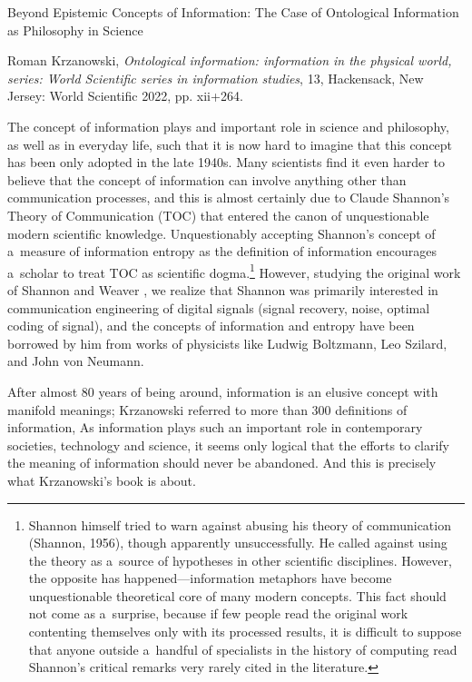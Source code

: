 

Beyond Epistemic Concepts of Information: The Case of Ontological Information as Philosophy in Science


Roman Krzanowski, \textit{Ontological information: information in the physical world, series: World Scientific series in information studies}, 13, Hackensack, New Jersey: World Scientific 2022, pp. xii+264.

The concept of information plays and important role in science and philosophy, as well as in everyday life, such that it is now hard to imagine that this concept has been only adopted in the late 1940s. Many scientists find it even harder to believe that the concept of information can involve anything other than communication processes, and this is almost certainly due to Claude Shannon's Theory of Communication (TOC)
\parencite[][]{shannon_mathematical_1949} %
 that entered the canon of unquestionable modern scientific knowledge. Unquestionably accepting Shannon's concept of a~measure of information entropy as the definition of information encourages a~scholar to treat TOC as scientific dogma.\footnote{ Shannon himself tried to warn against abusing his theory of communication (Shannon, 1956), though apparently unsuccessfully. He called against using the theory as a~source of hypotheses in other scientific disciplines. However, the opposite has happened—information metaphors have become unquestionable theoretical core of many modern concepts. This fact should not come as a~surprise, because if few people read the original work contenting themselves only with its processed results, it is difficult to suppose that anyone outside a~handful of specialists in the history of computing read Shannon's critical remarks very rarely cited in the literature.} However, studying the original work of Shannon and Weaver 
\parencite*[][p.3]{shannon_mathematical_1964}, %
 we realize that Shannon was primarily interested in communication engineering of digital signals (signal recovery, noise, optimal coding of signal), and the concepts of information and entropy have been borrowed by him from works of physicists like Ludwig Boltzmann, Leo Szilard, and John von Neumann.

After almost 80 years of being around, information is an elusive concept with manifold meanings; Krzanowski
\parencite*[][]{krzanowski_ontological_2022} %
 referred to more than 300 definitions of information, As information plays such an important role in contemporary societies, technology and science, it seems only logical that the efforts to clarify the meaning of information should never be abandoned. And this is precisely what Krzanowski's book is about.

